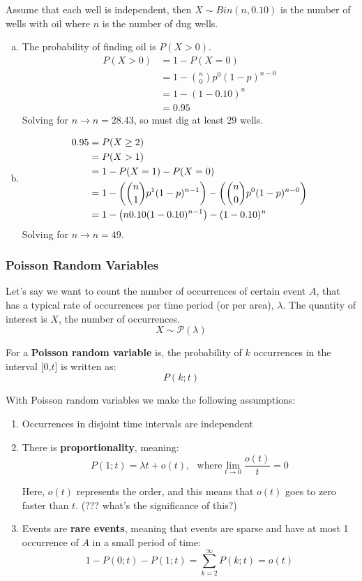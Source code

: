 \documentclass{report}
\DeclarePairedDelimiter\autobracket{(}{)}
\newcommand{\br}[1]{\autobracket*{#1}}
\begin{document}
Assume that each well is independent, then $ X \sim Bin(n, 0.10)$ is the number of wells with oil where $n$ is the number of dug wells.
\begin{enumerate}[(a)]
\item The probability of finding oil is $P(X > 0)$. 
\begin{align*}P(X > 0) & = 1 - P(X = 0) \\
& = 1 - {n \choose 0} p^0 (1-p)^{n-0} \\
& = 1 - (1 - 0.10)^n \\
& = 0.95 
\end{align*}
Solving for $n \rightarrow n = 28.43$, so must dig at least $\boxed{29}$ wells.

\item \begin{align*}
0.95 & = P(X \geq 2) \\
& = P(X > 1) \\
& = 1 - P(X = 1) - P(X = 0) \\
& = 1 - \br{{n \choose 1} p^1 (1-p)^{n-1}} - \br{{n \choose 0} p^0 (1-p)^{n-0}}  \\
& = 1 -  \br{n 0.10 (1-0.10)^{n-1}} - (1-0.10)^{n}
\end{align*}
Solving for $n \rightarrow \boxed{n = 49}$.

\end{enumerate}


\subsubsection{Poisson Random Variables}

Let's say we want to count the number of occurrences of  certain event $A$, that has a typical rate of occurrences per time period (or per area), $\lambda$. The quantity of interest is $X$, the number of occurrences.
$$X \sim \mathcal{P}(\lambda)$$

For a \textbf{Poisson random variable} is, the probability of $k$ occurrences in the interval [0,$t$] is written as: $$P(k; t)$$ 

With Poisson random variables we make the following assumptions: \begin{enumerate}
\item Occurrences in disjoint time intervals are independent
\item There is \textbf{proportionality}, meaning: $$P(1;t) = \lambda t + o(t), \ \ \ \text{where} \lim_{t\rightarrow0} \frac{o(t)}{t} = 0$$

Here, $o(t)$ represents the order, and this means that $o(t)$ goes to zero faster than $t$.  (??? what's the significance of this?)

\item Events are \textbf{rare events}, meaning that events are sparse and have at most 1 occurrence of $A$ in a  small period of time: $$1-P(0;t) - P(1;t) = \sum_{k=2}^{\infty} P(k;t) = o(t)$$
\end{enumerate}
\end{document}
